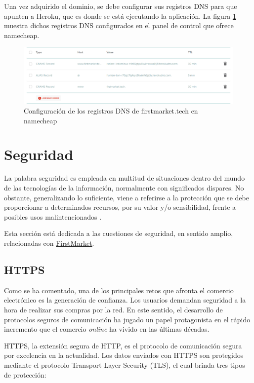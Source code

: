 \documentclass[a4paper,12pt,twoside,openright]{report}
\begin{document}
	Una vez adquirido el dominio, se debe configurar sus registros DNS para que apunten a Heroku, que es donde se está ejecutando la aplicación. La figura \ref{fig:dns} muestra dichos registros DNS configurados en el panel de control que ofrece namecheap.
	
	\begin{figure}[hbt!]
		\centering
		\includegraphics[width=\textwidth,keepaspectratio]{dns}
		\caption{Configuración de los registros DNS de firstmarket.tech en namecheap}
		\label{fig:dns}
	\end{figure}

	\chapter{Seguridad} \label{sec:security}
	La palabra seguridad es empleada en multitud de situaciones dentro del mundo de las tecnologías de la información, normalmente con significados dispares. No obstante, generalizando lo suficiente, viene a referirse a la protección que se debe proporcionar a determinados recursos, por su valor y/o sensibilidad, frente a posibles usos malintencionados \cite{CarloScarioni2019}.
	
	Esta sección está dedicada a las cuestiones de seguridad, en sentido amplio, relacionadas con \href{https://firstmarket.tech}{FirstMarket}.
	\section{HTTPS} \label{sec:https}
	Como se ha comentado, una de los principales retos que afronta el comercio electrónico es la generación de confianza. Los usuarios demandan seguridad a la hora de realizar sus compras por la red. En este sentido, el desarrollo de protocolos seguros de comunicación ha jugado un papel protagonista en el rápido incremento que el comercio \emph{online} ha vivido en las últimas décadas.
	
	HTTPS, la extensión segura de HTTP, es el protocolo de comunicación segura por excelencia en la actualidad. Los datos enviados con HTTPS son protegidos mediante el protocolo Transport Layer Security (TLS), el cual brinda tres tipos de protección:
	
\end{document}

